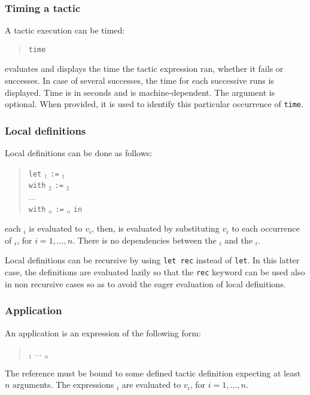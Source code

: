 \subsubsection{Timing a tactic
}

A tactic execution can be timed:
\begin{quote}
 {\tt time} {\qstring} {\tacexpr}
\end{quote}
evaluates {\tacexpr}
and displays the time the tactic expression ran, whether it fails or
successes. In case of several successes, the time for each successive
runs is displayed. Time is in seconds and is machine-dependent. The
{\qstring} argument is optional. When provided, it is used to identify
this particular occurrence of {\tt time}.

\subsubsection[Local definitions]{Local definitions
}

Local definitions can be done as follows:
\begin{quote}
{\tt let} {\ident}$_1$ {\tt :=} {\tacexpr}$_1$\\
{\tt with} {\ident}$_2$ {\tt :=} {\tacexpr}$_2$\\
...\\
{\tt with} {\ident}$_n$ {\tt :=} {\tacexpr}$_n$ {\tt in}\\
{\tacexpr}
\end{quote}
each {\tacexpr}$_i$ is evaluated to $v_i$, then, {\tacexpr} is
evaluated by substituting $v_i$ to each occurrence of {\ident}$_i$,
for $i=1,...,n$. There is no dependencies between the {\tacexpr}$_i$
and the {\ident}$_i$.

Local definitions can be recursive by using {\tt let rec} instead of
{\tt let}. In this latter case, the definitions are evaluated lazily
so that the {\tt rec} keyword can be used also in non recursive cases
so as to avoid the eager evaluation of local definitions.

\subsubsection{Application}

An application is an expression of the following form:
\begin{quote}
{\qualid} {\tacarg}$_1$ ... {\tacarg}$_n$
\end{quote}
The reference {\qualid} must be bound to some defined tactic
definition expecting at least $n$ arguments.  The expressions
{\tacexpr}$_i$ are evaluated to $v_i$, for $i=1,...,n$.

